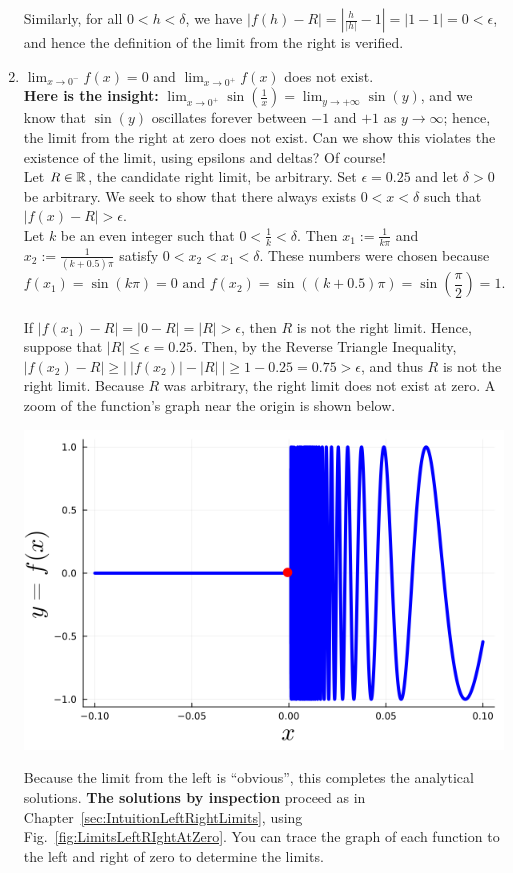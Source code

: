 \begin{enumerate}
  Similarly, for all $0 < h < \delta$, we have $|f(h)-R| = |\frac{h}{|h|}-1| = |1 - 1| = 0 < \epsilon$, and hence the definition of the limit from the right is verified.


    \item \Ans $\displaystyle \lim_{x \to 0^-} f(x) = 0$ and $\displaystyle \lim_{x \to 0^+} f(x)$ does not exist.\\

    \textbf{Here is the insight:}  $ \displaystyle \lim_{x \to 0^+} \sin(\frac{1}{x}) =  \lim_{y \to + \infty} \sin(y)$, and we know that $\sin(y)$ oscillates forever between $-1$ and $+1$ as $y \to \infty$; hence, the limit from the right at zero does not exist.  Can we show this violates the existence of the limit, using epsilons and deltas? Of course! \\

    Let $R \in \mathbb R$, the candidate right limit, be arbitrary. Set $\epsilon = 0.25$ and let $\delta >0$ be arbitrary. We seek to show that there always exists $0 < x < \delta$ such that $|f(x)-R| > \epsilon$.\\
    
    Let $k$ be an even integer such that $0 < \frac{1}{k} < \delta$. Then $x_1:= \frac{1}{k \pi}$ and $x_2:= \frac{1}{(k + 0.5) \pi}$ satisfy $0 < x_2 <  x_1 < \delta$. These numbers were chosen because 
    $$ f(x_1) = \sin (k \pi) = 0 \text{ and } f(x_2) = \sin ( (k + 0.5) \pi) = \sin(\frac{\pi}{2}) = 1.$$ \\
    
    If $|f(x_1) -R| = |0 - R| = |R| > \epsilon$, then $R$ is not the right limit. Hence, suppose that $|R| \le \epsilon = 0.25$. Then, by the Reverse Triangle Inequality, $|f(x_2) - R| \ge \big|~ |f(x_2)| - |R| ~\big| \ge 1 - 0.25 = 0.75 > \epsilon$, and thus $R$ is not the right limit. Because $R$ was arbitrary, the right limit does not exist at zero. A zoom of the function's graph near the origin is shown below.
    \begin{center}
    \includegraphics[width=0.45\columnwidth]{graphics/Chap04/LeftRightLimitAtZeroDZoom.png}
    \end{center}
    Because the limit from the left is ``obvious'', this completes the analytical solutions. \textbf{The solutions by inspection} proceed as in Chapter~\ref{sec:IntuitionLeftRightLimits}, using Fig.~\ref{fig:LimitsLeftRIghtAtZero}. You can trace the graph of each function to the left and right of zero to determine the limits.
    \end{enumerate}
    



